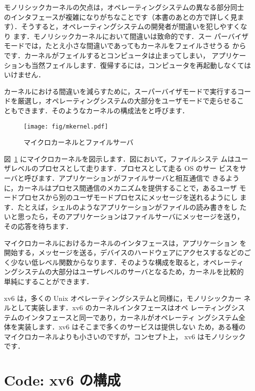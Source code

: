 モノリシックカーネルの欠点は，オペレーティングシステムの異なる部分同士
のインタフェースが複雑になりがちなことです（本書のあとの方で詳しく見ま
す）．そうすると，オペレーティングシステムの開発者が間違いを犯しやすくなり
ます．モノリシックカーネルにおいて間違いは致命的です．スー
パーバイザモードでは，たとえ小さな間違いであってもカーネルをフェイルさせうる
からです．カーネルがフェイルするとコンピュータは止まってしまい，
アプリケーションも当然フェイルします．復帰するには，コンピュータを再起動しなくては
いけません．

カーネルにおける間違いを減らすために，スーパーバイザモードで実行するコー
ドを厳選し，オペレーティングシステムの大部分をユーザモードで走らせるこ
ともできます．そのようなカーネルの構成法をと呼びます．

\begin{figure}[t]
\center
\texttt{[image: fig/mkernel.pdf]}
\caption{マイクロカーネルとファイルサーバ}
\label{fig:mkernel}
\end{figure}

図~\ref{fig:mkernel} にマイクロカーネルを図示します．図において，ファイルシステ
ムはユーザレベルのプロセスとして走ります．プロセスとして走る OS のサー
ビスをサーバと呼びます．アプリケーションがファイルサーバと相互通信で
きるように，カーネルはプロセス間通信のメカニズムを提供することで，あるユーザ
モードプロセスから別のユーザモードプロセスにメッセージを送れるようにし
ます．たとえば，シェルのようなアプリケーションがファイルの読み書きをし
たいと思ったら，そのアプリケーションはファイルサーバにメッセージを送り，
その応答を待ちます．

マイクロカーネルにおけるカーネルのインタフェースは，アプリケーション
を開始する，メッセージを送る，デバイスのハードウェアにアクセスするなどのご
く少ない低レベル関数からなります．そのような構成を取ると，オペレーティ
ングシステムの大部分はユーザレベルのサーバとなるため，カーネルを比較的
単純にすることができます．

xv6 は，多くの Unix オペレーティングシステムと同様に，モノリシックカー
ネルとして実装します．xv6 のカーネルインタフェースはオペ
レーティングシステムのインタフェースと同一であり，カーネルがオペレーティ
ングシステム全体を実装します．xv6 はそこまで多くのサービスは提供しない
ため，ある種のマイクロカーネルよりも小さいのですが，コンセプト上，
xv6 はモノリシックです．


\section{Code: xv6 の構成}

